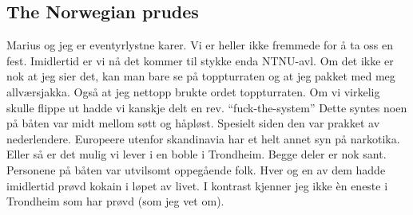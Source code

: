 \begin{figure}[p]
	\vspace*{-2.7cm}
	\centering
	\noindent{}
	\caption*{}
	\label{fig:kuna}
\end{figure}


\subsection*{The Norwegian prudes}

Marius og jeg er eventyrlystne karer. Vi er heller ikke fremmede for å
ta oss en fest. Imidlertid er vi nå det kommer til stykke enda
NTNU-avl. Om det ikke er nok at jeg sier det, kan man bare se på
toppturraten og at jeg pakket med meg allværsjakka. Også at jeg
nettopp brukte ordet toppturraten.
Om vi virkelig skulle flippe ut hadde vi kanskje delt en rev.
``fuck-the-system''
Dette syntes noen  på båten var midt mellom søtt og håpløst. Spesielt siden den var prakket av
nederlendere. Europeere utenfor skandinavia har et helt annet syn på narkotika. Eller så
er det mulig vi lever i en boble i Trondheim. Begge deler er nok sant.
Personene på båten var utvilsomt oppegående folk. Hver og en av dem
hadde imidlertid prøvd kokain i løpet av livet. I kontrast kjenner jeg
ikke èn eneste i Trondheim som har prøvd (som jeg vet om).


